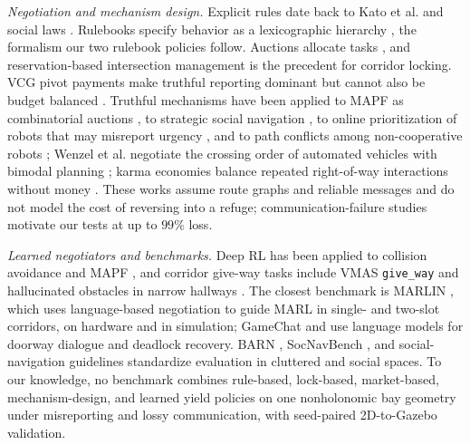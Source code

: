 \emph{Negotiation and mechanism design.} Explicit rules date back to Kato et al. \cite{kato1992coordinating} and social laws \cite{shoham1995social}. Rulebooks specify behavior as a lexicographic hierarchy \cite{censi2019rulebooks}, the formalism our two rulebook policies follow. Auctions allocate tasks \cite{gerkey2002sold}, and reservation-based intersection management \cite{dresner2008multiagent} is the precedent for corridor locking. VCG pivot payments \cite{vickrey1961counterspeculation,clarke1971multipart,groves1973incentives} make truthful reporting dominant but cannot also be budget balanced \cite{green1977characterization,myerson1983efficient}. Truthful mechanisms have been applied to MAPF as combinatorial auctions \cite{amir2015mapfauction,friedrich2024scalable}, to strategic social navigation \cite{chandra2023socialmapf}, to online prioritization of robots that may misreport urgency \cite{das2021omcorp}, and to path conflicts among non-cooperative robots \cite{gautier2022negotiated}; Wenzel et al. negotiate the crossing order of automated vehicles with bimodal planning \cite{wenzel2025bimodal}; karma economies balance repeated right-of-way interactions without money \cite{censi2019karma,elokda2024karma,elokda2025carma}. These works assume route graphs and reliable messages and do not model the cost of reversing into a refuge; communication-failure studies \cite{gielis2022critical} motivate our tests at up to $99\%$ loss.

\emph{Learned negotiators and benchmarks.} Deep RL has been applied to collision avoidance \cite{chen2017cadrl,fan2020distributed} and MAPF \cite{sartoretti2019primal}, and corridor give-way tasks include VMAS \texttt{give\_way} \cite{vmasgiveway,bettini2023heterogeneous} and hallucinated obstacles in narrow hallways \cite{park2023hallucination}. The closest benchmark is MARLIN \cite{marlin2024}, which uses language-based negotiation to guide MARL in single- and two-slot corridors, on hardware and in simulation; GameChat \cite{gamechat2025} and \cite{garg2024llm} use language models for doorway dialogue and deadlock recovery. BARN \cite{xiao2022barn}, SocNavBench \cite{biswas2022socnavbench}, and social-navigation guidelines \cite{francis2025principles} standardize evaluation in cluttered and social spaces. To our knowledge, no benchmark combines rule-based, lock-based, market-based, mechanism-design, and learned yield policies on one nonholonomic bay geometry under misreporting and lossy communication, with seed-paired 2D-to-Gazebo validation.

